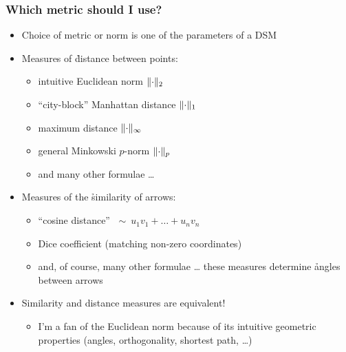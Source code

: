 \begin{frame}
  \frametitle{Which metric should I use?}

  \begin{itemize}
  \item Choice of metric or norm is one of the parameters of a DSM
    \pause
  \item Measures of \h{distance} between points:
    \begin{itemize}
    \item intuitive Euclidean norm $\norm[2]{\cdot}$
    \item ``city-block'' Manhattan distance $\norm[1]{\cdot}$
    \item maximum distance $\norm[\infty]{\cdot}$
    \item general Minkowski $p$-norm $\norm[p]{\cdot}$
    \item and many other formulae \ldots
    \end{itemize}
    \pause
  \item Measures of the \h{similarity} of arrows:
    \begin{itemize}
    \item ``cosine distance'' $\; \sim \ u_1 v_1 + \dots + u_n v_n$
    \item Dice coefficient (matching non-zero coordinates)
    \item and, of course, many other formulae \ldots
    \itemhand these measures determine \h{angles} between arrows
    \end{itemize}
    \pause
  \item Similarity and distance measures are equivalent!
    \begin{itemize}
    \item[\hand] I'm a fan of the Euclidean norm because of its intuitive
      geometric properties (angles, orthogonality, shortest path, \ldots)
    \end{itemize}
  \end{itemize}
\end{frame}

